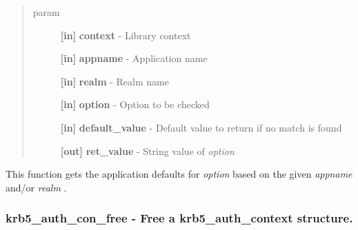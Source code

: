 \documentclass[letterpaper,10pt,english]{sphinxmanual}
\begin{document}
\begin{fulllineitems}
\label{appdev/refs/api/krb5_appdefault_string:krb5_appdefault_string}
\end{fulllineitems}

\begin{quote}\begin{description}
\item[{param}] \leavevmode
\textbf{{[}in{]}} \textbf{context} - Library context

\textbf{{[}in{]}} \textbf{appname} - Application name

\textbf{{[}in{]}} \textbf{realm} - Realm name

\textbf{{[}in{]}} \textbf{option} - Option to be checked

\textbf{{[}in{]}} \textbf{default\_value} - Default value to return if no match is found

\textbf{{[}out{]}} \textbf{ret\_value} - String value of \emph{option}

\end{description}\end{quote}

This function gets the application defaults for \emph{option} based on the given \emph{appname} and/or \emph{realm} .




{\hyperref[appdev/refs/api/krb5_appdefault_boolean:krb5_appdefault_boolean]{}}




\subsubsection{krb5\_auth\_con\_free -  Free a krb5\_auth\_context structure.}
\label{appdev/refs/api/krb5_auth_con_free:krb5-auth-con-free-free-a-krb5-auth-context-structure}\label{appdev/refs/api/krb5_auth_con_free::doc}

\begin{fulllineitems}
\label{appdev/refs/api/krb5_auth_con_free:krb5_auth_con_free}
\end{fulllineitems}
\end{document}
